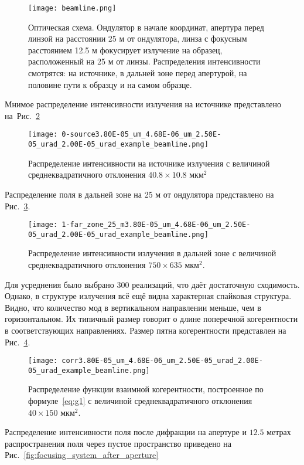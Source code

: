 \begin{figure}[H] 
	\centering 	\texttt{[image: beamline.png]}
	\caption{Оптическая схема. Ондулятор в начале координат, апертура перед линзой на расстоянии 25 м от ондулятора, линза с фокусным расстоянием 12.5 м фокусирует излучение на образец, расположенный на 25 м от линзы. Распределения интенсивности смотрятся: на источнике, в дальней зоне перед апертурой, на половине пути к образцу и на самом образце.}
	\label{fig:beamline}
\end{figure}
Мнимое распределение интенсивности излучения на источнике представлено на~Рис.~\ref{fig:focusing_system_source}
\begin{figure}[H] 
	\centering 	\texttt{[image: 0-source3.80E-05\_um\_4.68E-06\_um\_2.50E-05\_urad\_2.00E-05\_urad\_example\_beamline.png]}
	\caption{Распределение интенсивности на источнике излучения с величиной среднеквадратичного отклонения $40.8 \times 10.8$ мкм$^2$}
	\label{fig:focusing_system_source}
\end{figure}
\noindent Распределение поля в дальней зоне на 25 м от ондулятора представлено на Рис.~\ref{fig:focusing_system_far_zone}.
\begin{figure}[H] 
	\centering 	\texttt{[image: 1-far\_zone\_25\_m3.80E-05\_um\_4.68E-06\_um\_2.50E-05\_urad\_2.00E-05\_urad\_example\_beamline.png]}
	\caption{Распределение интенсивности излучения в дальней зоне с величиной среднеквадратичного отклонения $750 \times 635$ мкм$^2$.}
	\label{fig:focusing_system_far_zone}
\end{figure}
\noindent Для усреднения было выбрано 300 реализаций, что даёт достаточную сходимость. Однако, в структуре излучения всё ещё видна характерная спайковая структура. Видно, что количество мод в вертикальном направлении меньше, чем в горизонтальном. Их типичный размер говорит о длине поперечной когерентности в соответствующих направлениях. Размер пятна когерентности представлен на Рис.~\ref{fig:focusing_system_corr}.
\begin{figure}[H] 
	\centering 	\texttt{[image: corr3.80E-05\_um\_4.68E-06\_um\_2.50E-05\_urad\_2.00E-05\_urad\_example\_beamline.png]}
	\caption{Распределение функции взаимной когерентности, построенное по формуле~\ref{eq:g1} с величиной среднеквадратичного отклонения $40 \times 150 $ мкм$^2$.}
	\label{fig:focusing_system_corr}
\end{figure}
\noindent Распределение интенсивности поля после дифракции на апертуре и $12.5$ метрах распространения поля через пустое пространство приведено на Рис.~\ref{fig:focusing_system_after_aperture}
